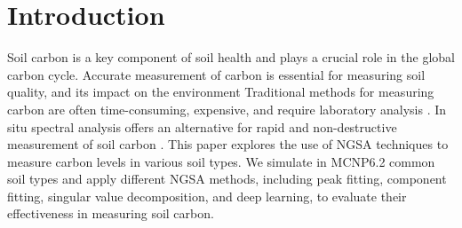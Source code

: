 \section{Introduction}

Soil carbon is a key component of soil health and plays a crucial role in the global carbon cycle. Accurate measurement of carbon is essential for measuring soil quality, and its impact on the environment \cite{lal_soil_2018} Traditional methods for measuring carbon are often time-consuming, expensive, and require laboratory analysis \cite{de_ros_advancing_2025}. In situ spectral analysis offers an alternative for rapid and non-destructive measurement of soil carbon \cite{yakubova_tagged_2019}.  
This paper explores the use of NGSA techniques to measure carbon levels in various soil types. We simulate in MCNP6.2 common soil types and apply different NGSA methods, including peak fitting, component fitting, singular value decomposition, and deep learning, to evaluate their effectiveness in measuring soil carbon.